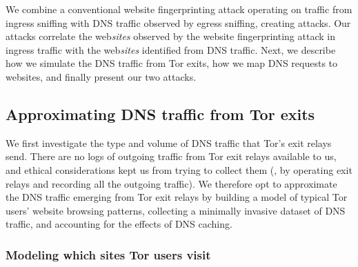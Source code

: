 We combine a conventional website fingerprinting attack operating on traffic
from ingress sniffing with
DNS traffic observed by egress sniffing, creating \name attacks. Our attacks
correlate the web\emph{sites} observed by the website fingerprinting attack in
ingress traffic with
the web\emph{sites} identified from DNS traffic. Next, we describe how we
simulate the DNS traffic from Tor exits, how we map DNS requests to websites,
and finally present our two \name attacks.

\subsection{Approximating DNS traffic from Tor exits}
\label{sec:attack:sim}

We first investigate the type and volume of DNS traffic that Tor's exit relays
send.  There are no logs of outgoing traffic
from Tor exit relays available to us, and ethical considerations kept us
from trying to collect them (\eg, by operating exit relays and recording
all the outgoing traffic). We therefore opt to approximate the DNS traffic
emerging from Tor exit relays by \first building a model of typical Tor
users' website browsing patterns, \second collecting a minimally invasive
dataset of DNS traffic, and \third accounting for the effects of DNS caching.

\subsubsection{Modeling which sites Tor users visit}
\label{sec:attack:pop}

